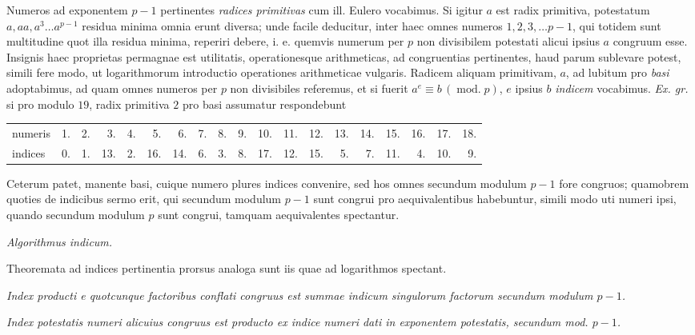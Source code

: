 Numeros ad exponentem $p-1$ pertinentes \emph{radices primitivas} cum ill. Eulero vocabimus. Si igitur $a$ est radix primitiva, potestatum $a,aa,a^3\ldots a^{p-1}$
residua minima omnia erunt diversa; unde facile deducitur, inter haec omnes numeros $1,2,3,\ldots p-1$, qui totidem sunt multitudine quot illa residua minima, reperiri debere, i. e. quemvis numerum per $p$ non divisibilem potestati alicui ipsius $a$ congruum esse. Insignis haec proprietas permagnae est utilitatis, operationesque arithmeticas, ad congruentias pertinentes, haud parum sublevare potest, simili fere modo, ut logarithmorum introductio operationes arithmeticae vulgaris. Radicem aliquam primitivam, $a$, ad lubitum pro \emph{basi} adoptabimus, ad quam omnes numeros per $p$ non divisibiles referemus, et si fuerit $a^e\equiv b\,(\operatorname{mod.}p)$, $e$ ipsius $b$ \emph{indicem} vocabimus. \emph{Ex. gr.} si pro modulo $19$, radix primitiva $2$ pro basi assumatur respondebunt

\begin{center}
\begingroup\small\setlength{\tabcolsep}{1.5pt}
\begin{tabular}{@{}l*{18}{r}@{}}
numeris & 1. & 2. & 3. & 4. & 5. & 6. & 7. & 8. & 9. & 10. & 11. & 12. & 13. & 14. & 15. & 16. & 17. & 18.\\
indices & 0. & 1. & 13. & 2. & 16. & 14. & 6. & 3. & 8. & 17. & 12. & 15. & 5. & 7. & 11. & 4. & 10. & 9.
\end{tabular}
\endgroup
\end{center}

Ceterum patet, manente basi, cuique numero plures indices convenire, sed hos omnes secundum modulum $p-1$ fore congruos; quamobrem quoties de indicibus sermo erit, qui secundum modulum $p-1$ sunt congrui pro aequivalentibus habebuntur, simili modo uti numeri ipsi, quando secundum modulum $p$ sunt congrui, tamquam aequivalentes spectantur.

\begin{center}\emph{Algorithmus indicum.}\end{center}

Theoremata ad indices pertinentia prorsus analoga sunt iis quae ad logarithmos spectant.

\emph{Index producti e quotcunque factoribus conflati congruus est summae indicum singulorum factorum secundum modulum $p-1$.}

\emph{Index potestatis numeri alicuius congruus est producto ex indice numeri dati in exponentem potestatis, secundum mod. $p-1$.}

